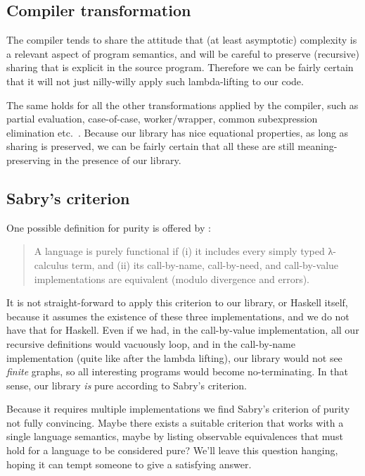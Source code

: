 \documentclass[manuscript,anonymous,screen,acmsmall]{acmart}
\begin{document}
\subsection{Compiler transformation}

The compiler tends to share the attitude that (at least asymptotic) complexity is a relevant aspect of program semantics, and will be careful to preserve (recursive) sharing that is explicit in the source program. Therefore we can be fairly certain that it will not just nilly-willy apply such lambda-lifting to our code.

The same holds for all the other transformations applied by the compiler, such as partial evaluation, case-of-case, worker/wrapper, common subexpression elimination etc.\ \citep{optimiser}. Because our library has nice equational properties, as long as sharing is preserved, we can be fairly certain that all these are still meaning-preserving in the presence of our library.

\subsection{Sabry's criterion}

One possible definition for purity is offered by \citet{sabry}:
\begin{quote}
A language is purely functional if (i) it includes every simply typed λ-calculus term, and
(ii) its call-by-name, call-by-need, and call-by-value implementations are equivalent (modulo
divergence and errors).
\end{quote}

It is not straight-forward to apply this criterion to our library, or Haskell itself, because it assumes the existence of these three implementations, and we do not have that for Haskell. Even if we had, in the call-by-value implementation, all our recursive definitions would vacuously loop, and in the call-by-name implementation (quite like after the lambda lifting), our library would not see \emph{finite} graphs, so all interesting programs would become no-terminating. In that sense, our library \emph{is} pure according to Sabry’s criterion.

Because it requires multiple implementations we find Sabry’s criterion of purity not fully convincing. Maybe there exists a suitable criterion that works with a single language semantics, maybe by listing observable equivalences that must hold for a language to be considered pure?
We'll leave this question hanging, hoping it can tempt someone to give a satisfying answer.
\end{document}
